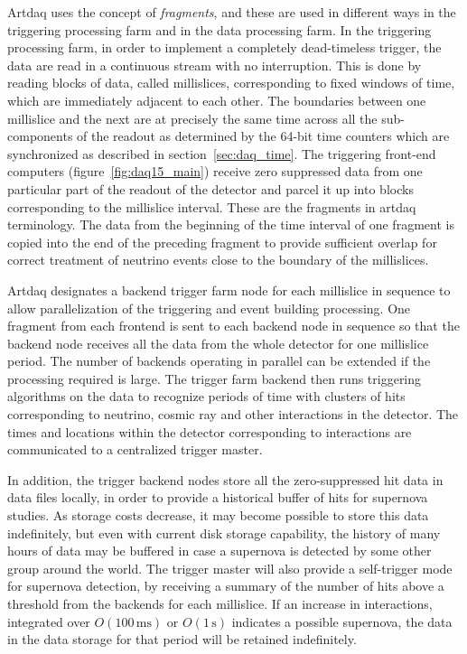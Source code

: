 Artdaq uses the concept of {\it fragments}, and these are used
in different ways in the triggering processing farm and in the data
processing farm.  In the triggering processing farm, in order to
implement a completely dead-timeless trigger, the data are read in a
continuous stream with no interruption.  This is done by reading
blocks of data, called millislices, corresponding to fixed windows of
time, which are immediately adjacent to each other.  The boundaries
between one millislice and the next are at precisely the same time
across all the sub-components of the readout as determined by the
64-bit time counters which are synchronized as described in
section~\ref{sec:daq_time}.  The triggering front-end computers
(figure~\ref{fig:daq15_main}) receive zero suppressed data from one
particular part of the readout of the detector and parcel it up into
blocks corresponding to the millislice interval.  These are the
fragments in artdaq terminology.  The data from the beginning of the
time interval of one fragment is copied into the end of the preceding
fragment to provide sufficient overlap for correct treatment of
neutrino events close to the boundary of the millislices.

Artdaq designates a backend trigger farm node for each millislice in
sequence to allow parallelization of the triggering and event building
processing.  One fragment from each frontend is sent to each backend
node in sequence so that the backend node receives all the data from
the whole detector for one millislice period.  The number of backends
operating in parallel can be extended if the processing required is
large. The trigger farm backend then runs triggering algorithms on the
data to recognize periods of time with clusters of hits corresponding
to neutrino, cosmic ray and other interactions in the detector.  The
times and locations within the detector corresponding to interactions
are communicated to a centralized trigger master.  

In addition, the trigger backend nodes store all the zero-suppressed
hit data in data files locally, in order to provide a historical
buffer of hits for supernova studies.  As storage costs decrease, it
may become possible to store this data indefinitely, but even with
current disk storage capability, the history of many hours of data may
be buffered in case a supernova is detected by some other group around
the world.  The trigger master will also provide a self-trigger mode
for supernova detection, by receiving a summary of the number of hits
above a threshold from the backends for each millislice.  If an
increase in interactions, integrated over $O(100\,\mathrm{ms})$ or
$O(1\,\mathrm{s})$ indicates a possible supernova, the data in the
data storage for that period will be retained indefinitely.

